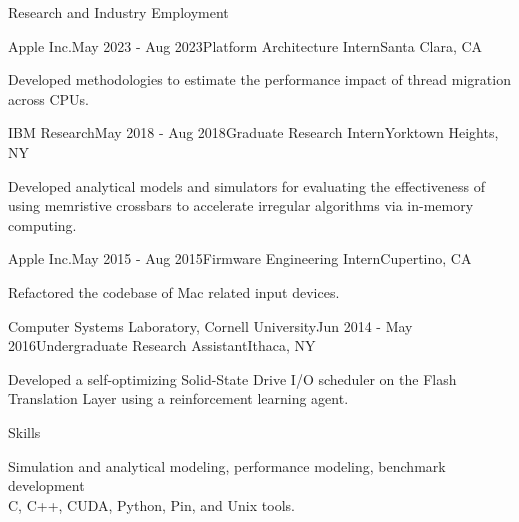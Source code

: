 \documentclass{resume} %
\begin{document}
\begin{rSection}{Research and Industry Employment}
\begin{rSubsection}{Apple Inc.}{May 2023 - Aug 2023}{Platform Architecture Intern}{Santa Clara, CA}

\item Developed methodologies to estimate the performance impact of thread migration across CPUs.
\end{rSubsection}

\begin{rSubsection}{IBM Research}{May 2018 - Aug 2018}{Graduate Research Intern}{Yorktown Heights, NY}

\item Developed analytical models and simulators for evaluating the effectiveness of using memristive crossbars
to accelerate irregular algorithms via in-memory computing.
\end{rSubsection}

\begin{rSubsection}{Apple Inc.}{May 2015 - Aug 2015}{Firmware Engineering Intern}{Cupertino, CA}

\item Refactored the codebase of Mac related input devices. 
\end{rSubsection}

\begin{rSubsection}{Computer Systems Laboratory, Cornell University}{Jun 2014 - May 2016}{Undergraduate Research Assistant}{Ithaca, NY}

\item Developed a self-optimizing Solid-State Drive I/O scheduler on the Flash Translation Layer using a reinforcement learning agent. 
\end{rSubsection}


\end{rSection}


\begin{rSection}{Skills}

Simulation and analytical modeling, performance modeling, benchmark development \\
C, C++, CUDA, Python, Pin, and Unix tools. \\

\end{rSection}
\end{document}
